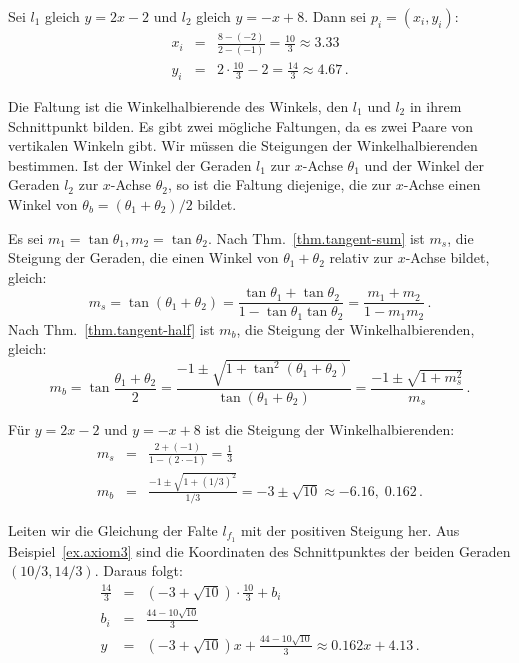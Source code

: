 \begin{example}\label{ex.axiom3}
Sei $l_1$ gleich $y=2x-2$ und $l_2$ gleich $y=-x+8$. Dann sei $p_i=(x_i,y_i)$:
\begin{eqnarray*}
x_i&=&\frac{8-(-2)}{2-(-1)}=\frac{10}{3}\approx 3.33\\
y_i &=& 2\cdot\frac{10}{3}-2=\frac{14}{3}\approx 4.67\,.
\end{eqnarray*}
\end{example}


Die Faltung ist die Winkelhalbierende des Winkels, den $l_1$ und $l_2$ in ihrem Schnittpunkt bilden. Es gibt zwei mögliche Faltungen, da es zwei Paare von vertikalen Winkeln gibt. Wir müssen die Steigungen der Winkelhalbierenden bestimmen. Ist der Winkel der Geraden $l_1$ zur $x$-Achse $\theta_1$ und der Winkel der Geraden $l_2$ zur $x$-Achse $\theta_2$, so ist die Faltung diejenige, die zur $x$-Achse einen Winkel von $\theta_b=(\theta_1+\theta_2)/2$ bildet.

Es sei $m_1=\tan\theta_1, m_2=\tan \theta_2$. Nach Thm.~\ref{thm.tangent-sum} ist $m_s$, die Steigung der Geraden, die einen Winkel von $\theta_1+\theta_2$ relativ zur $x$-Achse bildet, gleich:
\[
m_s=\tan(\theta_1+\theta_2)= \frac{\tan\theta_1+\tan\theta_2}{1-\tan\theta_1\tan\theta_2}=\frac{m_1+m_2}{1-m_1m_2}\,.
\]
Nach Thm.~\ref{thm.tangent-half} ist $m_b$, die Steigung der Winkelhalbierenden, gleich:
\[
m_b= \tan\frac{\theta_1+\theta_2}{2}=\frac{-1\pm\sqrt{1+\tan^2(\theta_1+\theta_2)}}{\tan (\theta_1+\theta_2)}=\frac{-1\pm\sqrt{1+m_s^2}}{m_s}\,.
\]
\begin{example}
Für $y=2x-2$ und $y=-x+8$ ist die Steigung der Winkelhalbierenden:
\begin{eqnarray*}
m_s&=&\frac{2+(-1)}{1-(2 \cdot -1)}=\frac{1}{3}\\
m_b&=&\frac{-1\pm\sqrt{1+(1/3)^2}}{1/3}=-3\pm \sqrt{10}\approx -6.16,\; 0.162\,.
\end{eqnarray*}
\end{example}

Leiten wir die Gleichung der Falte $l_{f_1}$ mit der positiven Steigung her. Aus Beispiel~\ref{ex.axiom3} sind die Koordinaten des Schnittpunktes der beiden Geraden $(10/3, 14/3)$. Daraus folgt:
\begin{eqnarray*}
\frac{14}{3} &=& (-3+\sqrt{10}) \cdot \frac{10}{3} + b_i\\ b_i&=&\frac{44-10\sqrt{10}}{3}\\
y&=& (-3+\sqrt{10})x + \frac{44-10\sqrt{10}}{3}\approx 0.162x+4.13\,.
\end{eqnarray*}

